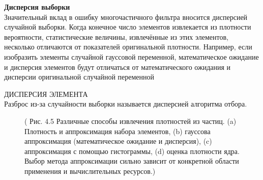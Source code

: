 \documentclass[10pt,a4paper]{article}
\begin{document}
\textbf{Дисперсия выборки}\\ 

Значительный вклад в ошибку многочастичного фильтра вносится дисперсией случайной выборки. Когда конечное число элементов извлекается из плотности вероятности, статистические величины, извлечённые из этих элементов, несколько отличаются от показателей оригинальной плотности. Например, если изобразить элементы  случайной гауссовой переменной, математическое ожидание и дисперсия элементов будут отличаться от математического ожидания и дисперсии оригинальной случайной переменной 

ДИСПЕРСИЯ ЭЛЕМЕНТА\\
Разброс из-за случайности выборки называется дисперсией алгоритма отбора.

\begin{figure}[H]
	\caption{ (  Рис. 4.5 Различные способы извлечения плотностей из частиц. (a) Плотность и аппроксимация набора элементов, (b) гауссова аппроксимация (математическое ожидание и дисперсия), (c) аппроксимация с помощью гистограммы, (d) оценка плотности ядра. Выбор метода аппроксимации сильно зависит от конкретной области применения и вычислительных ресурсов.)}
	\label{fig:45orig}
\end{figure}
\end{document}
